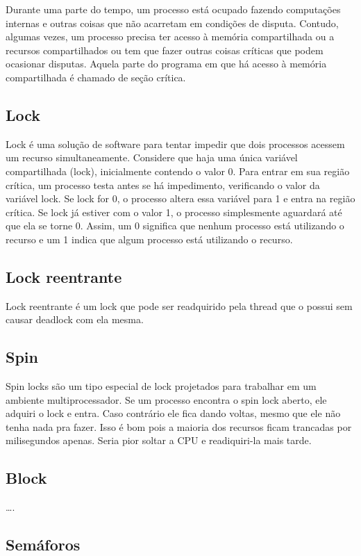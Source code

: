 Durante uma parte do tempo, um processo está ocupado fazendo computações internas e outras coisas que não acarretam
em condições de disputa. Contudo, algumas vezes, um processo precisa ter acesso à memória compartilhada ou a recursos compartilhados ou tem que fazer outras coisas críticas que podem ocasionar disputas. Aquela parte do programa
em que há acesso à memória compartilhada é chamado de seção crítica.


\subsection{Lock}

Lock é uma solução de software para tentar impedir que dois processos acessem um recurso 
simultaneamente. Considere que haja uma única variável compartilhada (lock), inicialmente 
contendo o valor 0. Para entrar em sua região crítica, um processo testa antes se há 
impedimento, verificando o valor da variável lock. Se lock for 0, o processo altera essa 
variável para 1 e entra na região crítica. Se lock já estiver com o valor 1, o processo 
simplesmente aguardará até que ela se torne 0. Assim, um 0 significa que nenhum processo 
está utilizando o recurso e um 1 indica que algum processo está utilizando o recurso. 


\subsection{Lock reentrante}

Lock reentrante é um lock que pode ser readquirido pela thread que o possui sem causar deadlock com ela mesma.

\subsection{Spin}

Spin locks são um tipo especial de lock projetados para trabalhar em um ambiente 
multiprocessador. Se um processo encontra o spin lock aberto, ele adquiri o lock e entra. 
Caso contrário ele fica dando voltas, mesmo que ele não tenha nada pra fazer. Isso é bom 
pois a maioria dos recursos ficam trancadas por milisegundos apenas. Seria pior soltar a 
CPU e readiquiri-la mais tarde.

\subsection{Block}
….


\subsection{Semáforos}

